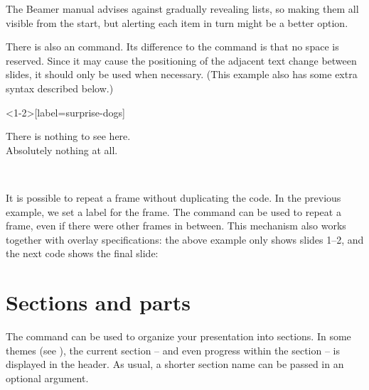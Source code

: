\begin{practices}
The Beamer manual advises against gradually revealing lists,
so making them all visible from the start,
but alerting each item in turn might be a better option.
\end{practices}


There is also an  command.
Its difference to the  command is that no space is reserved.
Since it may cause the positioning of the adjacent text change
between slides, it should only be used when necessary.
(This example also has some extra syntax described below.)
%
\begin{ExampleCode}
\begin{frame}<1-2>[label=surprise-dogs]

There is nothing to see here.\\
Absolutely nothing at all.\\

\end{frame}
\end{ExampleCode}
%
\begin{center}
~
\end{center}

It is possible to repeat a frame without duplicating the code.
In the previous example, we set a label for the frame.
The  command can be used to repeat a frame,
even if there were other frames in between.
This mechanism also works together with overlay specifications:
the above example only shows slides 1--2, and the next code shows the final slide:
%
\begin{ExampleCode}
\end{ExampleCode}
%
\begin{center}
\end{center}



%
%
%
\section{Sections and parts}

The  command can be used to organize your presentation into sections.
In some themes (see ),
the current section -- and even progress within the section -- is displayed in the header.
As usual, a shorter section name can be passed in an optional argument.

